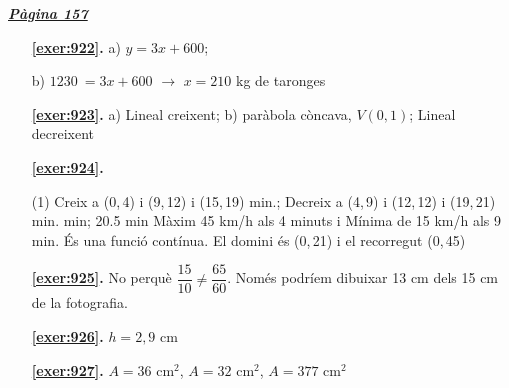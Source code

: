 \hyperlink{page.157}{\textbf{\em Pàgina 157}}
\begin{enumerate}
\item[\fontfamily{phv}\selectfont\color{blue}\textbf{\ref{exer:922}. }] \label{ans:922} 
 a) $y=3x+600$; \par b) $\mathrm {1230}\mathrm {\ }=3x+600$ $\rightarrow $ $x=210$ kg de taronges
 \end{enumerate}
\begin{enumerate}
\item[\fontfamily{phv}\selectfont\color{blue}\textbf{\ref{exer:923}. }] \label{ans:923} 
 a) Lineal creixent; \quad b) paràbola còncava, $V(0,1)$; \quad Lineal decreixent



 \item[\fontfamily{phv}\selectfont\color{blue}\textbf{\ref{exer:924}. }] \label{ans:924}
 \begin{tasks}[column-sep=1em, item-indent=1.3333em](1)
	 \task* Creix a (0,\,4) i (9,\,12) i (15,\,19) min.; Decreix a (4,\,9) i (12,\,12) i (19,\,21) min.
	  min; 20.5 min
	 \task* Màxim 45 km/h als 4 minuts i Mínima de 15 km/h als 9 min.
	 \task* És una funció contínua. El domini és (0,\,21) i el recorregut (0,\,45) 
\end{tasks}
\item[\fontfamily{phv}\selectfont\color{blue}\textbf{\ref{exer:925}. }] \label{ans:925} 
No perquè $\dfrac {15}{10} \neq \dfrac { 65}{60}$. Només podríem dibuixar 13 cm dels 15 cm de la fotografia.
\item[\fontfamily{phv}\selectfont\color{blue}\textbf{\ref{exer:926}. }] \label{ans:926} 
$h=2,9$ cm
\item[\fontfamily{phv}\selectfont\color{blue}\textbf{\ref{exer:927}. }] \label{ans:927} 
$A=36$ cm$^2$, $A=32$ cm$^2$, $A=377$ cm$^2$
 \end{enumerate}
\vspace{0.3cm}


